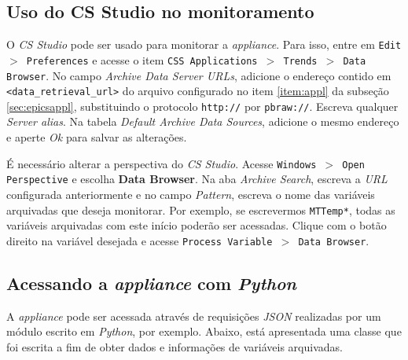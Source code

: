 \subsection{Uso do CS Studio no monitoramento}

O \textit{CS Studio} pode ser usado para monitorar a \textit{appliance}. Para
isso, entre em \texttt{Edit \(>\) Preferences} e acesse o item \texttt{CSS
Applications \(>\) Trends \(>\) Data Browser}. No campo \textit{Archive Data
Server URLs}, adicione o endereço contido em \texttt{<data\_retrieval\_url>} do
arquivo configurado no item \ref{item:appl} da subseção \ref{sec:epicsappl},
substituindo o protocolo \texttt{http://} por \texttt{pbraw://}. Escreva
qualquer \textit{Server alias}. Na tabela \textit{Default Archive Data Sources},
adicione o mesmo endereço e aperte \textit{Ok} para salvar as alterações.

\vspace{12pt}

É necessário alterar a perspectiva do \textit{CS Studio}. Acesse
\texttt{Windows \(>\) Open Perspective} e escolha \textbf{Data Browser}. Na aba
\textit{Archive Search}, escreva a \textit{URL} configurada anteriormente e no
campo \textit{Pattern}, escreva o nome das variáveis arquivadas que deseja
monitorar. Por exemplo, se escrevermos \texttt{MTTemp*}, todas as variáveis
arquivadas com este início poderão ser acessadas. Clique com o botão direito na
variável desejada e acesse \texttt{Process Variable \(>\) Data Browser}.

\subsection{Acessando a \textit{appliance} com \textit{Python}}

A \textit{appliance} pode ser acessada através de requisições \textit{JSON}
realizadas por um módulo escrito em \textit{Python}, por exemplo. Abaixo, está
apresentada uma classe que foi escrita a fim de obter dados e informações de
variáveis arquivadas.

\vspace{12pt}

